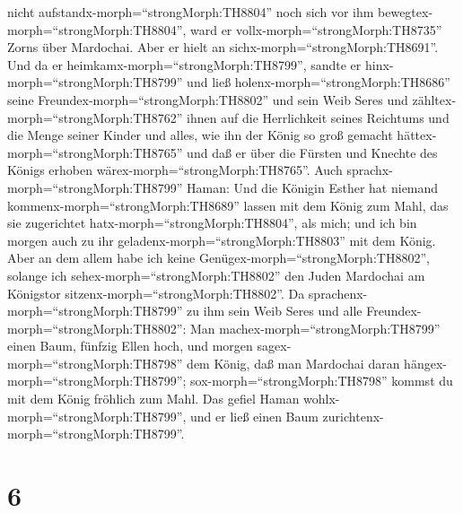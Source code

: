 nicht aufstandx-morph=``strongMorph:TH8804'' noch sich vor ihm
bewegtex-morph=``strongMorph:TH8804'', ward er
vollx-morph=``strongMorph:TH8735'' Zorns über Mardochai. 
Aber er hielt an sichx-morph=``strongMorph:TH8691''. Und da er
heimkamx-morph=``strongMorph:TH8799'', sandte er
hinx-morph=``strongMorph:TH8799'' und ließ
holenx-morph=``strongMorph:TH8686'' seine
Freundex-morph=``strongMorph:TH8802'' und sein Weib Seres 
und zähltex-morph=``strongMorph:TH8762'' ihnen auf die Herrlichkeit
seines Reichtums und die Menge seiner Kinder und alles, wie ihn der
König so groß gemacht hättex-morph=``strongMorph:TH8765'' und daß er
über die Fürsten und Knechte des Königs erhoben
wärex-morph=``strongMorph:TH8765''.  Auch
sprachx-morph=``strongMorph:TH8799'' Haman: Und die Königin Esther hat
niemand kommenx-morph=``strongMorph:TH8689'' lassen mit dem König zum
Mahl, das sie zugerichtet hatx-morph=``strongMorph:TH8804'', als mich;
und ich bin morgen auch zu ihr geladenx-morph=``strongMorph:TH8803'' mit
dem König.  Aber an dem allem habe ich keine
Genügex-morph=``strongMorph:TH8802'', solange ich
sehex-morph=``strongMorph:TH8802'' den Juden Mardochai am Königstor
sitzenx-morph=``strongMorph:TH8802''.  Da
sprachenx-morph=``strongMorph:TH8799'' zu ihm sein Weib Seres und alle
Freundex-morph=``strongMorph:TH8802'': Man
machex-morph=``strongMorph:TH8799'' einen Baum, fünfzig Ellen hoch, und
morgen sagex-morph=``strongMorph:TH8798'' dem König, daß man Mardochai
daran hängex-morph=``strongMorph:TH8799'';
sox-morph=``strongMorph:TH8798'' kommst du mit dem König fröhlich zum
Mahl. Das gefiel Haman wohlx-morph=``strongMorph:TH8799'', und er ließ
einen Baum zurichtenx-morph=``strongMorph:TH8799''.

\hypertarget{section-5}{%
\section{6}\label{section-5}}

